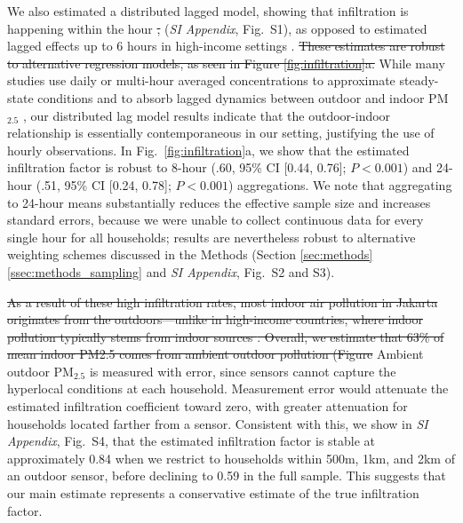 \documentclass[reqno,12pt,notitlepage]{article}
\providecommand{\DIFadd}[1]{{\protect\color{BLUE}#1}} %
\providecommand{\DIFdel}[1]{{\protect\color{red}\sout{#1}}} %
\providecommand{\DIFaddbegin}{} %
\providecommand{\DIFaddend}{} %
\providecommand{\DIFdelbegin}{} %
\providecommand{\DIFdelend}{} %
\begin{document}
\DIFadd{We also estimated a distributed lagged model, showing that infiltration is happening }\DIFaddend within the hour \DIFdelbegin \DIFdel{, }\DIFdelend \DIFaddbegin \DIFadd{(\textit{SI Appendix}, Fig.\ S1), }\DIFaddend as opposed to estimated lagged effects up to 6 hours in high-income settings \citep{burke_exposures_2022, lunderberg_assessing_2023}. \DIFdelbegin \DIFdel{These estimates are robust to alternative regression models, as seen in Figure \ref{fig:infiltration}a. 
}\DIFdelend \DIFaddbegin \DIFadd{While many studies use daily or multi-hour averaged concentrations to approximate steady-state conditions and to absorb lagged dynamics between outdoor and indoor PM$_{2.5}$ \citep{chen_review_2011}, our distributed lag model results indicate that the outdoor-indoor relationship is essentially contemporaneous in our setting, justifying the use of hourly observations. In Fig.\ \ref{fig:infiltration}a, we show that the estimated infiltration factor is robust to 8-hour (.60, 95\% CI [0.44, 0.76]; $P < 0.001$) and 24-hour (.51, 95\% CI [0.24, 0.78]; $P < 0.001$) aggregations. We note that aggregating to 24-hour means substantially reduces the effective sample size and increases standard errors, because we were unable to collect continuous data for every single hour for all households; results are nevertheless robust to alternative weighting schemes discussed in the Methods (Section \ref{sec:methods}\ref{ssec:methods_sampling} and \textit{SI Appendix}, Fig.\ S2 and S3). 
}\DIFaddend 

\DIFdelbegin \DIFdel{As a result of these high infiltration rates, most indoor air pollution in Jakarta originates from the outdoors---unlike in high-income countries, where indoor pollution typically stems from indoor sources \citep{metcalfe_making_2025}. Overall, we estimate that 63\% of mean indoor PM2.5 comes from ambient outdoor pollution (Figure }\DIFdelend \DIFaddbegin \DIFadd{Ambient outdoor PM$_{2.5}$ is measured with error, since sensors cannot capture the hyperlocal conditions at each household. Measurement error would attenuate the estimated infiltration coefficient toward zero, with greater attenuation for households located farther from a sensor. Consistent with this, we show in \textit{SI Appendix}, Fig.\ S4, that the estimated infiltration factor is stable at approximately 0.84 when we restrict to households within 500m, 1km, and 2km of an outdoor sensor, before declining to 0.59 in the full sample. This suggests that our main estimate represents a conservative estimate of the true infiltration factor.
}
\end{document}
